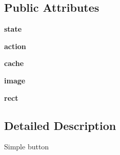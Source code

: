 \subsection*{\-Public \-Attributes}
\begin{DoxyCompactItemize}
\item 
\hypertarget{classinterface_1_1gui_1_1gui__elements_1_1_button_a631c2721cb95ec3cfb21fc654bcca1c8}{{\bfseries state}}\label{classinterface_1_1gui_1_1gui__elements_1_1_button_a631c2721cb95ec3cfb21fc654bcca1c8}

\item 
\hypertarget{classinterface_1_1gui_1_1gui__elements_1_1_button_a05b1ebdc0626dffa34d3c0795533a7b3}{{\bfseries action}}\label{classinterface_1_1gui_1_1gui__elements_1_1_button_a05b1ebdc0626dffa34d3c0795533a7b3}

\item 
\hypertarget{classinterface_1_1gui_1_1gui__elements_1_1_button_adaedbd71bd5acba3433501eaeb0c4bf4}{{\bfseries cache}}\label{classinterface_1_1gui_1_1gui__elements_1_1_button_adaedbd71bd5acba3433501eaeb0c4bf4}

\item 
\hypertarget{classinterface_1_1gui_1_1gui__elements_1_1_button_a2323e31a00f138728fc5304c4029c001}{{\bfseries image}}\label{classinterface_1_1gui_1_1gui__elements_1_1_button_a2323e31a00f138728fc5304c4029c001}

\item 
\hypertarget{classinterface_1_1gui_1_1gui__elements_1_1_button_a6fda1517fcb7d81bd9a154c4c1da981e}{{\bfseries rect}}\label{classinterface_1_1gui_1_1gui__elements_1_1_button_a6fda1517fcb7d81bd9a154c4c1da981e}

\end{DoxyCompactItemize}


\subsection{\-Detailed \-Description}
\begin{DoxyVerb}Simple button \end{DoxyVerb}
 

